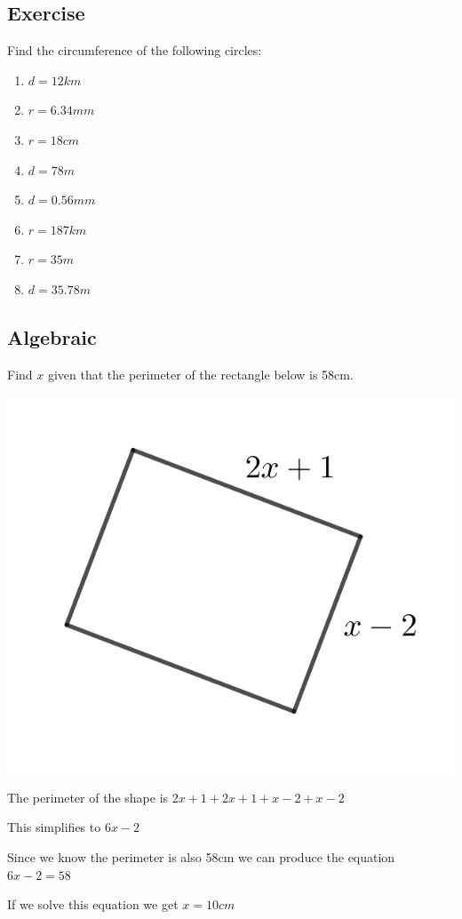 \subsection{Exercise}
Find the circumference of the following circles:
\begin{enumerate}
	\item $d = 12km$
	\item $r = 6.34mm$
	\item $r = 18cm$
	\item $d = 78m$
	\item $d = 0.56mm$
	\item $r= 187km$
	\item $r = 35m$
	\item $d = 35.78m$
\end{enumerate}
\subsection{Algebraic}
\begin{exmp}
	Find $x$ given that the perimeter of the rectangle below is 58cm.

	\bigskip

	\includegraphics{./Images/Measurement/perAlgExmp1.png}

	\bigskip

	The perimeter of the shape is $2x+1+2x+1+x-2+x-2$

	\bigskip

	This simplifies to $6x-2$

	\bigskip

	Since we know the perimeter is also 58cm we can produce the equation $6x-2=58$

	\bigskip

	If we solve this equation we get $x = 10cm$

\end{exmp}

